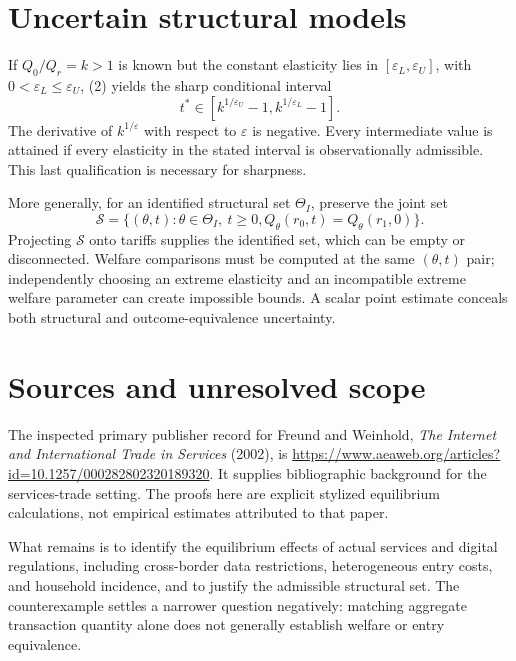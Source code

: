 \documentclass[11pt]{article}
\begin{document}
\section*{Uncertain structural models}
If $Q_0/Q_r=k>1$ is known but the constant elasticity lies in $[\varepsilon_L,\varepsilon_U]$, with $0<\varepsilon_L\leq\varepsilon_U$, (2) yields the sharp conditional interval
\[
 t^*\in[k^{1/\varepsilon_U}-1,k^{1/\varepsilon_L}-1].         \tag{9}
\]
The derivative of $k^{1/\varepsilon}$ with respect to $\varepsilon$ is negative. Every intermediate value is attained if every elasticity in the stated interval is observationally admissible. This last qualification is necessary for sharpness.

More generally, for an identified structural set $\Theta_I$, preserve the joint set
\[
 \mathcal S=\{(\theta,t):\theta\in\Theta_I,\ t\geq0,
                       Q_\theta(r_0,t)=Q_\theta(r_1,0)\}.
\]
Projecting $\mathcal S$ onto tariffs supplies the identified set, which can be empty or disconnected. Welfare comparisons must be computed at the same $(\theta,t)$ pair; independently choosing an extreme elasticity and an incompatible extreme welfare parameter can create impossible bounds. A scalar point estimate conceals both structural and outcome-equivalence uncertainty.

\section*{Sources and unresolved scope}
The inspected primary publisher record for Freund and Weinhold, \emph{The Internet and International Trade in Services} (2002), is
\url{https://www.aeaweb.org/articles?id=10.1257/000282802320189320}.
It supplies bibliographic background for the services-trade setting. The proofs here are explicit stylized equilibrium calculations, not empirical estimates attributed to that paper.

What remains is to identify the equilibrium effects of actual services and digital regulations, including cross-border data restrictions, heterogeneous entry costs, and household incidence, and to justify the admissible structural set. The counterexample settles a narrower question negatively: matching aggregate transaction quantity alone does not generally establish welfare or entry equivalence.
\end{document}
